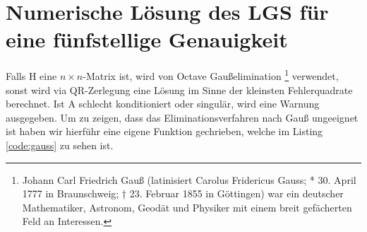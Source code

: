 \chapter{Numerische Lösung des LGS für eine fünfstellige Genauigkeit}
Falls H eine \(n \times n\)-Matrix ist, wird von Octave Gaußelimination \footnote{Johann Carl
Friedrich Gauß (latinisiert Carolus Fridericus Gauss; * 30. April 1777 in Braunschweig; † 23.
Februar 1855 in Göttingen) war ein deutscher Mathematiker, Astronom, Geodät und Physiker mit einem
breit gefächerten Feld an Interessen.} verwendet, sonst wird via QR-Zerlegung eine Lösung im Sinne
der kleinsten Fehlerquadrate berechnet. Ist A schlecht konditioniert oder singulär, wird eine
Warnung ausgegeben. Um zu zeigen, dass das Eliminationsverfahren nach Gauß ungeeignet ist haben wir
hierführ eine eigene Funktion gechrieben, welche im Listing \ref{code:gauss} zu sehen ist.

\lstset{label=code:gauss, caption=Gauß-Eliminationsverfahren als Matlab-/Octavescript}
